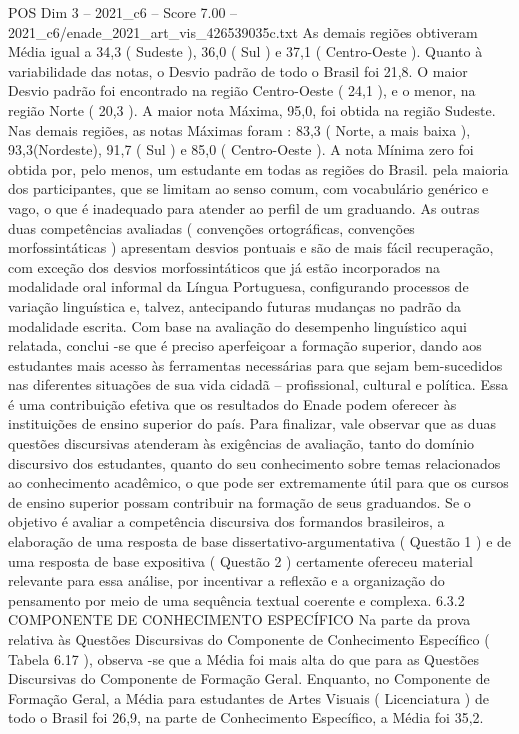 \begin{textsample}{POS Dim 3 – 2021\_c6 – Score 7.00 – 2021\_c6/enade\_2021\_art\_vis\_426539035c.txt}
As demais regiões obtiveram Média igual a 34,3 ( Sudeste ), 36,0 ( Sul ) e 37,1 ( Centro-Oeste ).
Quanto à variabilidade das notas, o Desvio padrão de todo o Brasil foi 21,8.
O maior Desvio padrão foi encontrado na região Centro-Oeste ( 24,1 ), e o menor, na região Norte ( 20,3 ).
A maior nota Máxima, 95,0, foi obtida na região Sudeste.
Nas demais regiões, as notas Máximas foram : 83,3 ( Norte, a mais baixa ), 93,3(Nordeste), 91,7 ( Sul ) e 85,0 ( Centro-Oeste ).
A nota Mínima zero foi obtida por, pelo menos, um estudante em todas as regiões do Brasil. pela maioria dos participantes, que se limitam ao senso comum, com vocabulário genérico e vago, o que é inadequado para atender ao perfil de um graduando.
As outras duas competências avaliadas ( convenções ortográficas, convenções morfossintáticas ) apresentam desvios pontuais e são de mais fácil recuperação, com exceção dos desvios morfossintáticos que já estão incorporados na modalidade oral informal da Língua Portuguesa, configurando processos de variação linguística e, talvez, antecipando futuras mudanças no padrão da modalidade escrita.
Com base na avaliação do desempenho linguístico aqui relatada, conclui -se que é preciso aperfeiçoar a formação superior, dando aos estudantes mais acesso às ferramentas necessárias para que sejam bem-sucedidos nas diferentes situações de sua vida cidadã – profissional, cultural e política.
Essa é uma contribuição efetiva que os resultados do Enade podem oferecer às instituições de ensino superior do país.
Para finalizar, vale observar que as duas questões discursivas atenderam às exigências de avaliação, tanto do domínio discursivo dos estudantes, quanto do seu conhecimento sobre temas relacionados ao conhecimento acadêmico, o que pode ser extremamente útil para que os cursos de ensino superior possam contribuir na formação de seus graduandos.
Se o objetivo é avaliar a competência discursiva dos formandos brasileiros, a elaboração de uma resposta de base dissertativo-argumentativa ( Questão 1 ) e de uma resposta de base expositiva ( Questão 2 ) certamente ofereceu material relevante para essa análise, por incentivar a reflexão e a organização do pensamento por meio de uma sequência textual coerente e complexa. 6.3.2 COMPONENTE DE CONHECIMENTO ESPECÍFICO Na parte da prova relativa às Questões Discursivas do Componente de Conhecimento Específico ( Tabela 6.17 ), observa -se que a Média foi mais alta do que para as Questões Discursivas do Componente de Formação Geral.
Enquanto, no Componente de Formação Geral, a Média para estudantes de Artes Visuais ( Licenciatura ) de todo o Brasil foi 26,9, na parte de Conhecimento Específico, a Média foi 35,2.

\end{textsample}
